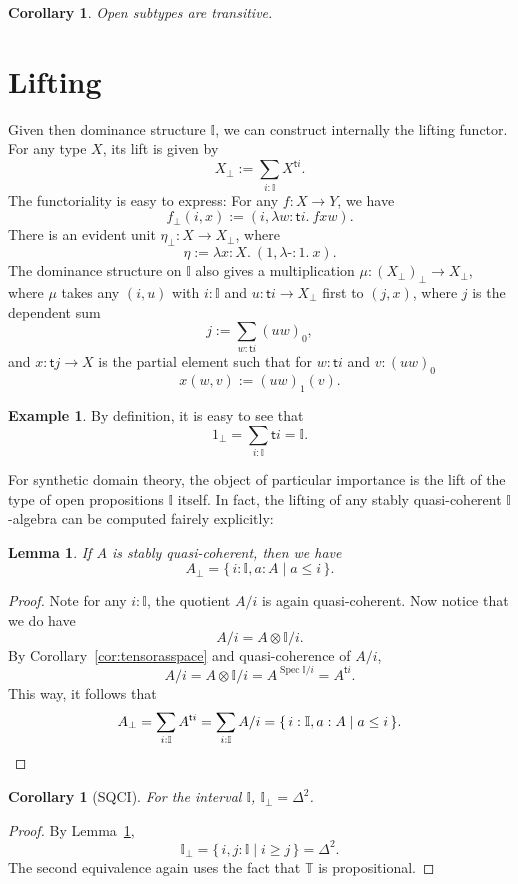 \documentclass[12pt]{amsart}
\newtheorem{lemma}[theorem]{Lemma}
\newtheorem{corollary}[theorem]{Corollary}
\theoremstyle{definition}
\newtheorem{example}[theorem]{Example}
\newcommand{\mbb}[1]{\mathbb{#1}}
\newcommand{\T}{\mbb T}
\newcommand{\I}{\mbb I}
\newcommand{\ms}[1]{\mathsf{#1}}
\newcommand{\scomp}[2]{\{\,#1\mid#2\,\}}
\newcommand{\prt}{_{\bot}}
\newcommand{\ld}[2]{\lambda #1\!\colon\!\!#2.\ }
\newcommand{\hp}{\text{-}}
\newcommand{\spec}{\operatorname{Spec}}
\begin{document}
\begin{corollary}\label{cor:opentransitive}
  Open subtypes are transitive.
\end{corollary}


\section{Lifting}\label{sec:lifting}

Given then dominance structure $\I$, we can construct internally the lifting functor. For any type $X$, its lift is given by
\[ X\prt := \sum_{i:\I}X^{\ms ti}. \]
The functoriality is easy to express: For any $f : X \to Y$, we have
\[ f\prt(i,x) := (i,\ld{w}{\ms ti}fxw). \]
There is an evident unit $\eta\prt : X \to X\prt$, where
\[ \eta := \ld x X(1,\ld\hp 1 x). \]
The dominance structure on $\I$ also gives a multiplication $\mu : (X\prt)\prt \to X\prt$, where $\mu$ takes any $(i,u)$ with $i : \I$ and $u : \ms ti \to X\prt$ first to $(j,x)$, where $j$ is the dependent sum
\[ j := \sum_{w:\ms ti} (uw)_0, \]
and $x : \ms tj \to X$ is the partial element such that for $w : \ms ti$ and $v : (uw)_0$
\[ x(w,v) := (uw)_1(v). \]

\begin{example}
  By definition, it is easy to see that
  \[ 1\prt = \sum_{i:\I}\ms ti = \I. \]
\end{example}

For synthetic domain theory, the object of particular importance is the lift of the type of open propositions $\I$ itself. In fact, the lifting of any stably quasi-coherent $\I$-algebra can be computed fairely explicitly:

\begin{lemma}\label{lem:liftingofalgebra}
  If $A$ is stably quasi-coherent, then we have
  \[ A\prt = \scomp{i : \I, a : A}{a \le i}. \]
\end{lemma}
\begin{proof}
  Note for any $i : \I$, the quotient $A/i$ is again quasi-coherent. Now notice that we do have
  \[ A/i = A \otimes \I/i. \]
  By Corollary~\ref{cor:tensorasspace} and quasi-coherence of $A/i$, 
  \[ A/i = A \otimes \I/i = A^{\spec \I/i} = A^{\ms ti}. \]
  This way, it follows that 
  \[ A\prt = \sum_{i:\I}A^{\ms ti} = \sum_{i:\I}A/i = \scomp{i : \I, a : A}{a \le i}. \qedhere \]
\end{proof}

\begin{corollary}[SQCI]
  For the interval $\I$, $\I\prt = \Delta^2$.
\end{corollary}
\begin{proof}
  By Lemma~\ref{lem:liftingofalgebra}, 
  \[ \I\prt = \scomp{i,j : \I}{i \ge j} = \Delta^2. \]
  The second equivalence again uses the fact that $\T$ is propositional.
\end{proof}
\end{document}
